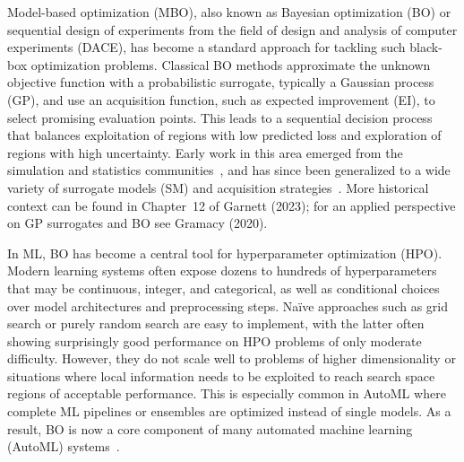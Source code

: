\documentclass[12pt,letterpaper]{article}
\begin{document}
Model-based optimization (MBO), also known as Bayesian optimization (BO) or sequential design of experiments from the field of design and analysis of computer experiments (DACE)\cite{sacks1989}, has become a standard approach for tackling such black-box optimization problems.
Classical BO methods\cite{jones1998} approximate the unknown objective function with a probabilistic surrogate, typically a Gaussian process (GP)\cite{rasmussen2005}, and use an acquisition function, such as expected improvement (EI), to select promising evaluation points.
This leads to a sequential decision process that balances exploitation of regions with low predicted loss and exploration of regions with high uncertainty.
Early work in this area emerged from the simulation and statistics communities~\cite{mockus1978, jones1998}, and has since been generalized to a wide variety of surrogate models (SM) and acquisition strategies~\cite{brochu2010, shahriari2016}.
More historical context can be found in Chapter~12 of Garnett (2023)\cite{garnett2023}; for an applied perspective on GP surrogates and BO see Gramacy (2020)\cite{gramacy2020}.

In ML, BO has become a central tool for hyperparameter optimization (HPO)\cite{bergstra2011, snoek2012, thornton2013, bischl2023}.
Modern learning systems often expose dozens to hundreds of hyperparameters that may be continuous, integer, and categorical, as well as conditional choices over model architectures and preprocessing steps.
Na\"ive approaches such as grid search or purely random search\cite{bergstra2012} are easy to implement, with the latter often showing surprisingly good performance on HPO problems of only moderate difficulty.
However, they do not scale well to problems of higher dimensionality or situations where local information needs to be exploited to reach search space regions of acceptable performance.
This is especially common in AutoML where complete ML pipelines or ensembles are optimized instead of single models. 
As a result, BO is now a core component of many automated machine learning (AutoML) systems~\cite{feurer2022, kotthoff2017}.
\end{document}
